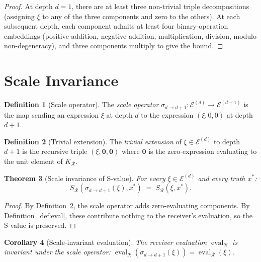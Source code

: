 \documentclass[twocolumn,11pt,a4paper]{article}
\theoremstyle{thmstyle}
\newtheorem{theorem}{Theorem}[section]
\newtheorem{corollary}[theorem]{Corollary}
\theoremstyle{thmstyle}
\theoremstyle{definition}
\newtheorem{definition}[theorem]{Definition}
\theoremstyle{remark}
\DeclareMathOperator{\eval}{eval}
\newcommand{\Expr}{\mathcal{E}}
\newcommand{\receiver}{\mathcal{R}}
\newcommand{\Sscalar}{S}
\begin{document}
\begin{proof}
At depth $d = 1$, there are at least three
non-trivial triple decompositions (assigning $\xi$ to
any of the three components and zero to the others).
At each subsequent depth, each component admits at
least four binary-operation embeddings (positive
addition, negative addition, multiplication, division,
modulo non-degeneracy), and three components multiply
to give the bound.
\end{proof}

\section{Scale Invariance}
\label{sec:scale-invariance}

\begin{definition}[Scale operator]\label{def:scale-op}
The \emph{scale operator}
$\sigma_{d \to d+1}: \Expr^{(d)} \to \Expr^{(d+1)}$
is the map sending an expression $\xi$ at depth $d$
to the expression $(\xi, 0, 0)$ at depth $d+1$.
\end{definition}

\begin{definition}[Trivial extension]\label{def:trivial-ext}
The \emph{trivial extension} of $\xi \in \Expr^{(d)}$
to depth $d+1$ is the recursive triple
$(\xi, \mathbf{0}, \mathbf{0})$ where $\mathbf{0}$ is
the zero-expression evaluating to the unit element of
$K_{\receiver}$.
\end{definition}

\begin{theorem}[Scale invariance of S-value]
\label{thm:scale-inv}
For every $\xi \in \Expr^{(d)}$ and every
truth $x^{*}$:
\[
\Sscalar_{\receiver}(\sigma_{d \to d+1}(\xi), x^{*})
\;=\; \Sscalar_{\receiver}(\xi, x^{*}).
\]
\end{theorem}

\begin{proof}
By Definition~\ref{def:trivial-ext}, the scale operator
adds zero-evaluating components.  By
Definition~\ref{def:eval}, these contribute nothing to
the receiver's evaluation, so the S-value is preserved.
\end{proof}

\begin{corollary}[Scale-invariant evaluation]
\label{cor:scale-inv-eval}
The receiver evaluation $\eval_{\receiver}$ is
invariant under the scale operator:
$\eval_{\receiver}(\sigma_{d \to d+1}(\xi)) =
\eval_{\receiver}(\xi)$.
\end{corollary}
\end{document}
